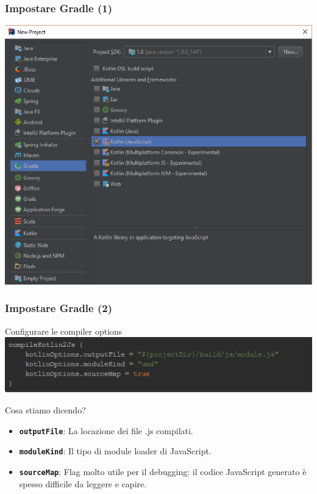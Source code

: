     \begin{frame}
      \frametitle{Impostare Gradle (1)}
      \begin{center}
      \includegraphics[scale=0.5]{NewProject}
      \end{center}
    \end{frame}

    \begin{frame}
      \frametitle{Impostare Gradle (2)}
      \begin{block}{Configurare le compiler options}
        \includegraphics[scale=0.67]{Kt2JsGradle}
      \end{block}
      \begin{block}{Cosa stiamo dicendo?}
        \begin{itemize}
          \item \textbf{\texttt{outputFile}}: La locazione dei file .js compilati.
          \item \textbf{\texttt{moduleKind}}: Il tipo di module loader di JavaScript.
          \item \textbf{\texttt{sourceMap}}: Flag molto utile per il debugging: il codice JavaScript generato è spesso difficile da leggere e capire.
        \end{itemize}
      \end{block}
    \end{frame}

